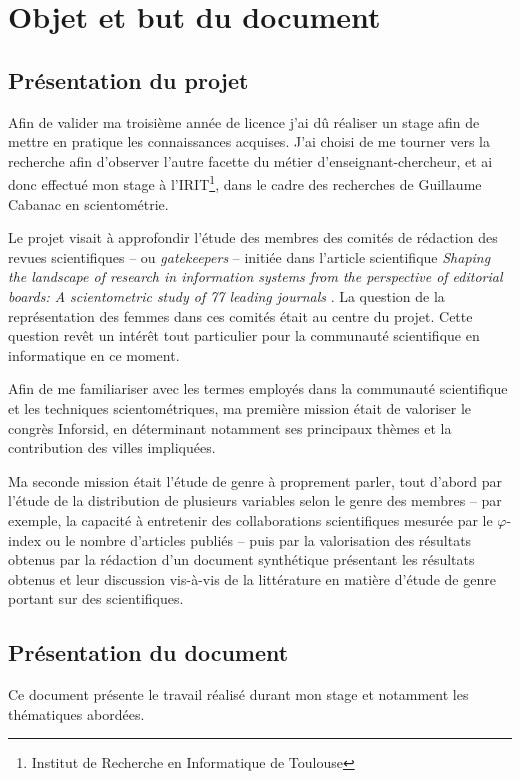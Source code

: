 \cleardoublepage
{} %

\chapter{Objet et but du document}


\section{Présentation du projet}
	Afin de valider ma troisième année de licence j'ai dû réaliser un stage afin de mettre en pratique les connaissances acquises. J'ai choisi de me tourner vers la recherche afin d'observer l'autre facette du métier d'enseignant-chercheur, et ai donc effectué mon stage à l'IRIT\footnote{Institut de Recherche en Informatique de Toulouse}, dans le cadre des recherches de Guillaume Cabanac en scientométrie.
	
	Le projet visait à approfondir l'étude des membres des comités de rédaction des revues scientifiques -- ou \textit{gatekeepers} -- initiée dans l'article scientifique 
\textit{Shaping the landscape of research in information systems from the perspective of editorial boards: A scientometric study of 77 leading journals} \citep{shaping} . La question de la représentation des femmes dans ces comités était au centre du projet. Cette question revêt un intérêt tout particulier pour la communauté scientifique en informatique en ce moment.

	Afin de me familiariser avec les termes employés dans la communauté scientifique et les techniques scientométriques, ma première mission était de valoriser le congrès Inforsid, en déterminant notamment ses principaux thèmes et la contribution des villes impliquées.

	Ma seconde mission était l'étude de genre à proprement parler, tout d'abord par l'étude de la distribution de plusieurs variables selon le genre des membres -- par exemple, la capacité à entretenir des collaborations scientifiques mesurée par le $\varphi$-index \citep{hirsch, partnership} ou le nombre d'articles publiés -- puis par la valorisation des résultats obtenus par la rédaction d'un document synthétique présentant les résultats obtenus et leur discussion vis-à-vis de la littérature en matière d'étude de genre portant sur des scientifiques.



\section{Présentation du document}
	Ce document présente le travail réalisé durant mon stage et notamment les thématiques abordées.
	
